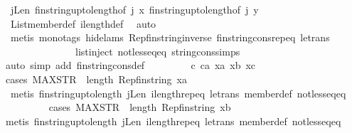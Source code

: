\begin{isabellebody}
\ jLen\ fin{\isacharunderscore}string{\isacharunderscore}upto{\isacharunderscore}length{\isacharbrackleft}of\ j\ x{\isacharbrackright}\ fin{\isacharunderscore}string{\isacharunderscore}upto{\isacharunderscore}length{\isacharbrackleft}of\ j\ y{\isacharbrackright}\isanewline
\ \ \ \ \ \ \ \ \ \ \isamarkupfalse%
\ List{\isachardot}member{\isacharunderscore}def\ ilength{\isacharunderscore}def\ \isamarkupfalse%
\ auto\isanewline
\ \ \ \ \ \ \ \ \ \ \isamarkupfalse%
\ {\isacharparenleft}metis\ {\isacharparenleft}mono{\isacharunderscore}tags{\isacharcomma}\ hide{\isacharunderscore}lams{\isacharparenright}\ Rep{\isacharunderscore}fin{\isacharunderscore}string{\isacharunderscore}inverse\ fin{\isacharunderscore}string{\isacharunderscore}cons{\isachardot}rep{\isacharunderscore}eq\ le{\isacharunderscore}trans\isanewline
\ \ \ \ \ \ \ \ \ \ \ \ \ \ list{\isachardot}inject\ not{\isacharunderscore}less{\isacharunderscore}eq{\isacharunderscore}eq\ string{\isacharunderscore}cons{\isachardot}simps{\isacharparenright}\isanewline
\ \ \ \ \ \ \ \ \ \ \isamarkupfalse%
\isanewline
\ \ \ \ \ \ \isamarkupfalse%
\isanewline
\ \ \ \ \ \ \isamarkupfalse%
{\isacharparenleft}auto\ simp\ add{\isacharcolon}\ fin{\isacharunderscore}string{\isacharunderscore}cons{\isacharunderscore}def{\isacharparenright}\isanewline
\ \ \ \ \ \ \isamarkupfalse%
\ \ c\ ca\ xa\ xb\ xc\isanewline
\ \ \ \ \ \ \ \ \isamarkupfalse%
{\isacharparenleft}cases\ {\isachardoublequoteopen}MAX{\isacharunderscore}STR\ {\isasymle}\ length\ {\isacharparenleft}Rep{\isacharunderscore}fin{\isacharunderscore}string\ xa{\isacharparenright}{\isachardoublequoteclose}{\isacharparenright}\isanewline
\ \ \ \ \ \ \ \ \ \isamarkupfalse%
\ {\isacharparenleft}metis\ fin{\isacharunderscore}string{\isacharunderscore}upto{\isacharunderscore}length\ jLen\ ilength{\isachardot}rep{\isacharunderscore}eq\ le{\isacharunderscore}trans\ member{\isacharunderscore}def\ not{\isacharunderscore}less{\isacharunderscore}eq{\isacharunderscore}eq{\isacharparenright}\isanewline
\ \ \ \ \ \ \ \ \isamarkupfalse%
{\isacharparenleft}cases\ {\isachardoublequoteopen}MAX{\isacharunderscore}STR\ {\isasymle}\ length\ {\isacharparenleft}Rep{\isacharunderscore}fin{\isacharunderscore}string\ xb{\isacharparenright}{\isachardoublequoteclose}{\isacharparenright}\isanewline
\ \ \ \ \ \ \ \ \ \isamarkupfalse%
{\isacharparenleft}metis\ fin{\isacharunderscore}string{\isacharunderscore}upto{\isacharunderscore}length\ jLen\ ilength{\isachardot}rep{\isacharunderscore}eq\ le{\isacharunderscore}trans\ member{\isacharunderscore}def\ not{\isacharunderscore}less{\isacharunderscore}eq{\isacharunderscore}eq{\isacharparenright}\isanewline

\end{isabellebody}
